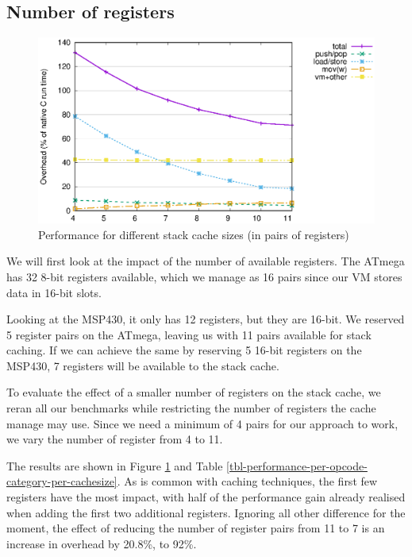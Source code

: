 \subsection{Number of registers}

\begin{figure}
\centering
\includegraphics[width=\mygraphsize]{cachesize-performance-per-opcode-category.eps}
\caption{Performance for different stack cache sizes (in pairs of registers)}
\label{fig-performance-per-opcode-category-per-cachesize}
\end{figure}



We will first look at the impact of the number of available registers. The ATmega has 32 8-bit registers available, which we manage as 16 pairs since our VM stores data in 16-bit slots.

Looking at the MSP430, it only has 12 registers, but they are 16-bit. We reserved 5 register pairs on the ATmega, leaving us with 11 pairs available for stack caching. If we can achieve the same by reserving 5 16-bit registers on the MSP430, 7 registers will be available to the stack cache.

To evaluate the effect of a smaller number of registers on the stack cache, we reran all our benchmarks while restricting the number of registers the cache manage may use. Since we need a minimum of 4 pairs for our approach to work, we vary the number of register from 4 to 11.

The results are shown in Figure \ref{fig-performance-per-opcode-category-per-cachesize} and Table \ref{tbl-performance-per-opcode-category-per-cachesize}. As is common with caching techniques, the first few registers have the most impact, with half of the performance gain already realised when adding the first two additional registers. Ignoring all other difference for the moment, the effect of reducing the number of register pairs from 11 to 7 is an increase in overhead by 20.8\%, to 92\%.


